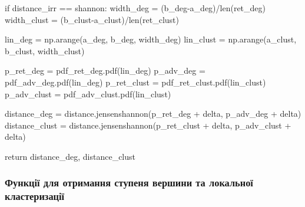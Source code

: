 \documentclass[
  letterpaper,
]{report}
\newenvironment{Shaded}{\begin{snugshade}}{\end{snugshade}}
\newcommand{\BuiltInTok}[1]{\textcolor[rgb]{0.00,0.23,0.31}{#1}}
\newcommand{\ControlFlowTok}[1]{\textcolor[rgb]{0.00,0.23,0.31}{#1}}
\newcommand{\NormalTok}[1]{\textcolor[rgb]{0.00,0.23,0.31}{#1}}
\newcommand{\OperatorTok}[1]{\textcolor[rgb]{0.37,0.37,0.37}{#1}}
\newcommand{\StringTok}[1]{\textcolor[rgb]{0.13,0.47,0.30}{#1}}
\begin{document}
\begin{Shaded}
\begin{Highlighting}[]
    \ControlFlowTok{if}\NormalTok{ distance\_irr }\OperatorTok{==} \StringTok{\textquotesingle{}shannon\textquotesingle{}}\NormalTok{:                                 }
\NormalTok{        width\_deg }\OperatorTok{=}\NormalTok{ (b\_deg}\OperatorTok{{-}}\NormalTok{a\_deg)}\OperatorTok{/}\BuiltInTok{len}\NormalTok{(ret\_deg)}
\NormalTok{        width\_clust }\OperatorTok{=}\NormalTok{ (b\_clust}\OperatorTok{{-}}\NormalTok{a\_clust)}\OperatorTok{/}\BuiltInTok{len}\NormalTok{(ret\_clust)}

\NormalTok{        lin\_deg }\OperatorTok{=}\NormalTok{ np.arange(a\_deg, b\_deg, width\_deg) }
\NormalTok{        lin\_clust }\OperatorTok{=}\NormalTok{ np.arange(a\_clust, b\_clust, width\_clust)}

\NormalTok{        p\_ret\_deg }\OperatorTok{=}\NormalTok{ pdf\_ret\_deg.pdf(lin\_deg) }
\NormalTok{        p\_adv\_deg }\OperatorTok{=}\NormalTok{ pdf\_adv\_deg.pdf(lin\_deg) }
\NormalTok{        p\_ret\_clust }\OperatorTok{=}\NormalTok{ pdf\_ret\_clust.pdf(lin\_clust) }
\NormalTok{        p\_adv\_clust }\OperatorTok{=}\NormalTok{ pdf\_adv\_clust.pdf(lin\_clust)}
    
\NormalTok{        distance\_deg }\OperatorTok{=}\NormalTok{ distance.jensenshannon(p\_ret\_deg }\OperatorTok{+}\NormalTok{ delta, p\_adv\_deg }\OperatorTok{+}\NormalTok{ delta)}
\NormalTok{        distance\_clust }\OperatorTok{=}\NormalTok{ distance.jensenshannon(p\_ret\_clust }\OperatorTok{+}\NormalTok{ delta, p\_adv\_clust }\OperatorTok{+}\NormalTok{ delta)}
      
    \ControlFlowTok{return}\NormalTok{ distance\_deg, distance\_clust}
\end{Highlighting}
\end{Shaded}

\hypertarget{ux444ux443ux43dux43aux446ux456ux457-ux434ux43bux44f-ux43eux442ux440ux438ux43cux430ux43dux43dux44f-ux441ux442ux443ux43fux435ux43dux44f-ux432ux435ux440ux448ux438ux43dux438-ux442ux430-ux43bux43eux43aux430ux43bux44cux43dux43eux457-ux43aux43bux430ux441ux442ux435ux440ux438ux437ux430ux446ux456ux457}{%
\subsubsection{Функції для отримання ступеня вершини та локальної
кластеризації}\label{ux444ux443ux43dux43aux446ux456ux457-ux434ux43bux44f-ux43eux442ux440ux438ux43cux430ux43dux43dux44f-ux441ux442ux443ux43fux435ux43dux44f-ux432ux435ux440ux448ux438ux43dux438-ux442ux430-ux43bux43eux43aux430ux43bux44cux43dux43eux457-ux43aux43bux430ux441ux442ux435ux440ux438ux437ux430ux446ux456ux457}}
\end{document}
